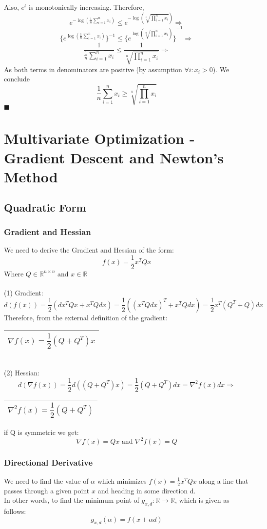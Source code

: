 \documentclass{article}
\newcommand{\rectres}[1]{
\begin{center}
\begin{tabular}{ |c| }
\hline
 #1\\
\hline
\end{tabular}
\end{center}
}
\newcommand{\qed}{\hfill$\blacksquare$}
\begin{document}
Also, $e^t$ is monotonically increasing. Therefore,
$$e^{-\log(\frac{1}{n} \sum_{i=1}^n x_i)} \leq e^{-\log(\sqrt[n]{\prod_{i=1}^n x_i})} \Rightarrow$$
$$\{e^{\log{(\frac{1}{n} \sum_{i=1}^n x_i)}}\}^{-1} \leq {\{e^{\log(\sqrt[n]{\prod_{i=1}^n x_i})}\}}^{-1} \Rightarrow$$
$$\frac{1}{\frac{1}{n} \sum_{i=1}^n x_i} \leq \frac{1}{\sqrt[n]{\prod_{i=1}^n x_i}}\Rightarrow$$
As both terms in denominators are positive (by assumption $\forall i : x_i > 0$). We conclude\\
$$\frac{1}{n} \sum_{i=1}^n x_i \geq \sqrt[n]{\prod_{i=1}^n x_i}$$
\qed

\newpage

\section{Multivariate Optimization - Gradient Descent
and Newton’s Method}

\subsection{Quadratic Form}

\subsubsection{Gradient and Hessian}
We need to derive the Gradient and Hessian of the form:
$$f(x)=\frac{1}{2} x^T Q x$$
Where $Q \in \mathbb{R}^{n \times n}$ and $x \in \mathbb{R}$\\
\\
(1) Gradient: $$d(f(x)) = \frac{1}{2}(dx^T Q x + x^T Q dx) = \frac{1}{2}((x^T Q dx)^T + x^T Q dx) = \frac{1}{2} x^T (Q^T + Q) dx$$
Therefore, from the external definition of the gradient:
\rectres{$$\nabla f(x) = \frac{1}{2} (Q + Q^T)x$$}
\\
(2) Hessian:\\
$$d(\nabla f(x)) =  \frac{1}{2} d((Q + Q^T)x) = \frac{1}{2} (Q + Q^T)dx = \nabla^2 f(x) dx \Rightarrow$$
\rectres{$$\nabla^2 f(x) = \frac{1}{2} (Q + Q^T)$$}
if Q is symmetric we get:\\
    $$\nabla f(x) =Qx \text{ and  }\nabla^2 f(x) = Q$$
\subsubsection{Directional Derivative}
We need to find the value of $\alpha$ which minimizes $f(x)=\frac{1}{2} x^T Q x$ along a line that passes through a given point $x$ and heading in some direction d.\\ In other words, to find the minimum point of $g_{x,d} : \mathbb{R} \rightarrow \mathbb{R}$, which is given as follows:\\
$$g_{x,d}(\alpha) = f(x + \alpha d)$$
\end{document}
